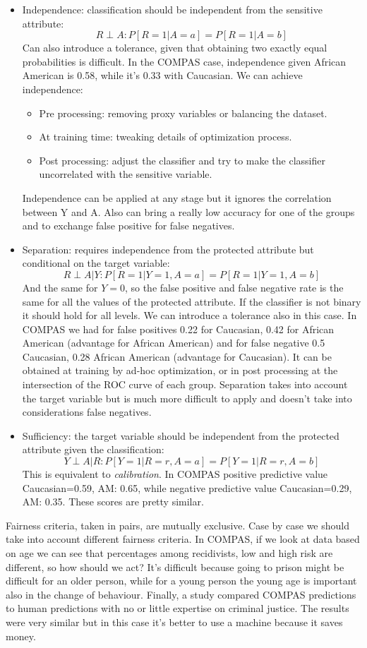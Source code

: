 \begin{itemize}
    \item Independence: classification should be independent from the sensitive attribute:
    $$
        R \perp A: P[R=1|A=a] = P[R=1|A=b]
    $$
    Can also introduce a tolerance, given that obtaining two exactly equal probabilities is difficult. In the COMPAS case, independence given African American is 0.58, while it's 0.33 with Caucasian. We can achieve independence:
    \begin{itemize}
        \item Pre processing: removing proxy variables or balancing the dataset.
        \item At training time: tweaking details of optimization process.
        \item Post processing: adjust the classifier and try to make the classifier uncorrelated with the sensitive variable.
    \end{itemize}
    Independence can be applied at any stage but it ignores the correlation between Y and A. Also can bring a really low accuracy for one of the groups and to exchange false positive for false negatives.
    \item Separation: requires independence from the protected attribute but conditional on the target variable:
    $$
        R \perp A | Y: P[R=1|Y=1, A=a] = P[R=1|Y=1, A=b]
    $$
    And the same for $Y=0$, so the false positive and false negative rate is the same for all the values of the protected attribute. If the classifier is not binary it should hold for all levels. We can introduce a tolerance also in this case. 
    In COMPAS we had for false positives 0.22 for Caucasian, 0.42 for African American (advantage for African American) and for false negative 0.5 Caucasian, 0.28 African American (advantage for Caucasian). It can be obtained at training by ad-hoc optimization, or in post processing at the intersection of the ROC curve of each group. Separation takes into account the target variable but is much more difficult to apply and doesn't take into considerations false negatives.
    \item Sufficiency: the target variable should be independent from the protected attribute given the classification:
    $$
        Y \perp A | R: P[Y=1|R=r, A=a] = P[Y=1|R=r, A=b]
    $$
    This is equivalent to \textit{calibration}. 
    In COMPAS positive predictive value Caucasian=0.59, AM: 0.65, while negative predictive value Caucasian=0.29, AM: 0.35. These scores are pretty similar.
\end{itemize}
Fairness criteria, taken in pairs, are mutually exclusive. Case by case we should take into account different fairness criteria. In COMPAS, if we look at data based on age we can see that percentages among recidivists, low and high risk are different, so how should we act? It's difficult because going to prison might be difficult for an older person, while for a young person the young age is important also in the change of behaviour. Finally, a study compared COMPAS predictions to human predictions with no or little expertise on criminal justice. The results were very similar but in this case it's better to use a machine because it saves money.
